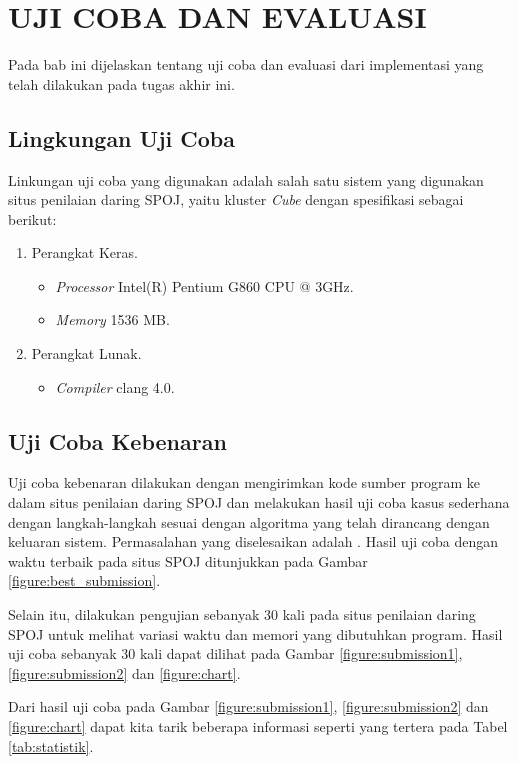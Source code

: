 \chapter{UJI COBA DAN EVALUASI}

Pada bab ini dijelaskan tentang uji coba dan evaluasi dari implementasi yang telah dilakukan pada tugas akhir ini.

\section{Lingkungan Uji Coba}

Linkungan uji coba yang digunakan adalah salah satu sistem yang digunakan situs penilaian daring SPOJ, yaitu kluster \textit{Cube} dengan spesifikasi sebagai berikut:

\begin{enumerate}
	\item Perangkat Keras.
	\begin{itemize}
		\item \textit{Processor} Intel(R) Pentium G860 CPU @ 3GHz.
		\item \textit{Memory} 1536 MB.
	\end{itemize}
	\item Perangkat Lunak.
	\begin{itemize}
		\item \textit{Compiler} clang 4.0.
	\end{itemize}			
\end{enumerate} 

\section{Uji Coba Kebenaran}

Uji coba kebenaran dilakukan dengan mengirimkan kode sumber program ke dalam situs penilaian daring SPOJ dan melakukan hasil uji coba kasus sederhana dengan langkah-langkah sesuai dengan algoritma yang telah dirancang dengan keluaran sistem. Permasalahan yang diselesaikan adalah \problem{}. Hasil uji coba dengan waktu terbaik pada situs SPOJ ditunjukkan pada Gambar \ref{figure:best_submission}.

Selain itu, dilakukan pengujian sebanyak 30 kali pada situs penilaian daring SPOJ untuk melihat variasi waktu dan memori  yang dibutuhkan program. Hasil uji coba sebanyak 30 kali dapat dilihat pada Gambar \ref{figure:submission1}, \ref{figure:submission2} dan \ref{figure:chart}.

Dari hasil uji coba pada Gambar \ref{figure:submission1}, \ref{figure:submission2} dan \ref{figure:chart}  dapat kita tarik beberapa informasi seperti yang tertera pada Tabel \ref{tab:statistik}.

